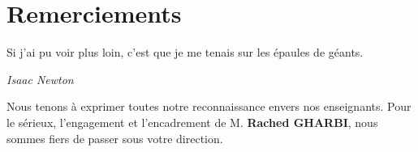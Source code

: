 \chapter*{Remerciements}

\vspace*{3cm}
\epigraph{Si j'ai pu voir plus loin, c'est que je me tenais sur les épaules de géants.}{\textit{Isaac Newton}}

Nous tenons à exprimer toutes notre reconnaissance envers nos enseignants. Pour le sérieux, l'engagement et l'encadrement de M. {\bf Rached GHARBI}, nous sommes fiers de passer sous votre direction.